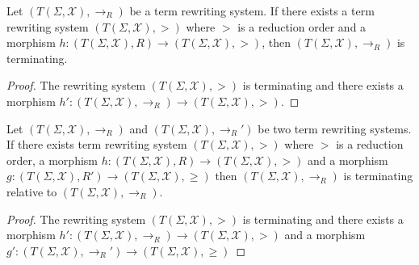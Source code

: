 \begin{theorem}
    Let $(T(\Sigma,\mathcal{X}), \to_R)$ be a term rewriting system. If there exists a term rewriting system $(T(\Sigma,\mathcal{X}),>)$ where $>$ is a reduction order and a morphism $h:(T(\Sigma,\mathcal{X}),R) \to (T(\Sigma,\mathcal{X}),>)$, then $(T(\Sigma,\mathcal{X}), \to_R)$ is terminating.
  \end{theorem}
  \begin{proof}
    The rewriting system $(T(\Sigma,\mathcal{X}),>)$ is terminating and there exists a morphism $h':(T(\Sigma,\mathcal{X}),\to_R) \to (T(\Sigma,\mathcal{X}),>)$.
  \end{proof}
  
  \begin{theorem}
    Let $(T(\Sigma,\mathcal{X}), \to_R)$ and $(T(\Sigma,\mathcal{X}), \to_R')$ be two term rewriting systems. If there exists term rewriting system $(T(\Sigma,\mathcal{X}), >)$ where $>$ is a reduction order, a morphism $h: (T(\Sigma,\mathcal{X}),R) \to (T(\Sigma,\mathcal{X}), >)$ and a morphism $g: (T(\Sigma,\mathcal{X}),R') \to (T(\Sigma,\mathcal{X}), \geq)$ then 
     $(T(\Sigma,\mathcal{X}), \to_R)$ is terminating relative to $(T(\Sigma,\mathcal{X}), \to_R)$.
  \end{theorem}
  \begin{proof}
    The rewriting system $(T(\Sigma,\mathcal{X}),>)$ is terminating and there exists a morphism $h':(T(\Sigma,\mathcal{X}),\to_R) \to (T(\Sigma,\mathcal{X}),>)$ and a morphism $g':(T(\Sigma,\mathcal{X}),\to_R') \to (T(\Sigma,\mathcal{X}),\geq)$
  \end{proof}